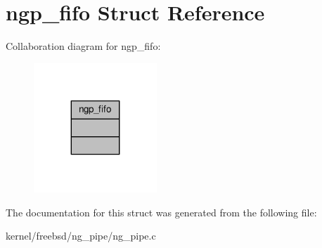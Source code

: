 \hypertarget{structngp__fifo}{\section{ngp\+\_\+fifo Struct Reference}
\label{structngp__fifo}
}


Collaboration diagram for ngp\+\_\+fifo\+:
\nopagebreak
\begin{figure}[H]
\begin{center}
\leavevmode
\includegraphics[width=131pt]{structngp__fifo__coll__graph}
\end{center}
\end{figure}


The documentation for this struct was generated from the following file\+:\begin{DoxyCompactItemize}
\item 
kernel/freebsd/ng\+\_\+pipe/ng\+\_\+pipe.\+c\end{DoxyCompactItemize}
